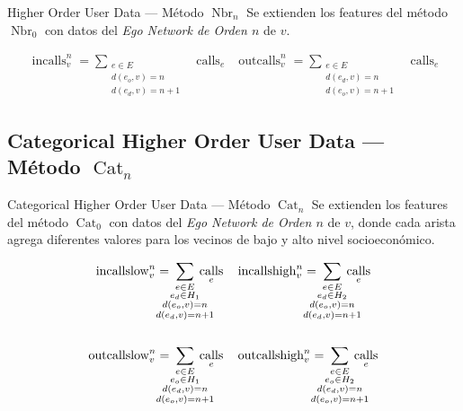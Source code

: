 \documentclass[usenames,dvipsnames,table]{beamer}
\DeclareMathOperator{\calls}{calls}
\DeclareMathOperator{\ego}{Nbr}
\DeclareMathOperator{\cat}{Cat}
\DeclareMathOperator{\incalls}{incalls}
\DeclareMathOperator{\outcalls}{outcalls}
\newcommand{\meight}{\!\!\!\!\!\!\!\!}
\begin{document}
\begin{frame}{Higher Order User Data --- Método $\ego_n$}
	Se extienden los features del método $\ego_0$ con datos del \emph{Ego Network de Orden $n$} de $v$.

	\begin{align*}
		\incalls^n_v  = \meight\sum_{\substack{e \in E \\ d(e_o, v) = n \\ d(e_d, v) = n + 1}}\meight&\calls_e &
		\outcalls^n_v = \meight\sum_{\substack{e \in E \\ d(e_d, v) = n \\ d(e_o, v) = n + 1}}\meight &\calls_e
	\end{align*}
\end{frame}

\subsection{Categorical Higher Order User Data --- Método $\cat_n$}
\begin{frame}{Categorical Higher Order User Data --- Método $\cat_n$}
	Se extienden los features del método $\cat_0$ con datos del \emph{Ego Network de Orden $n$} de $v$, donde cada arista agrega diferentes valores para los vecinos de bajo y alto nivel socioeconómico.

	\begin{align*}
		\operatorname{incallslow}^n_v = \meight\sum_{\substack{e \in E \\ e_d \in H_1 \\ d \left( e_o, v \right) = n \\ d \left( e_d, v \right) = n + 1}}\meight \calls_e &\quad
		\operatorname{incallshigh}^n_v = \meight\sum_{\substack{e \in E \\ e_d \in H_2 \\ d \left( e_o, v \right) = n \\ d \left( e_d, v \right) = n + 1}}\meight \calls_e \\
		\vspace{1em} \\
		\operatorname{outcallslow}^n_v = \meight\sum_{\substack{e \in E \\ e_o \in H_1 \\ d \left( e_d, v \right) = n \\ d \left( e_o, v \right) = n + 1}}\meight \calls_e &\quad
		\operatorname{outcallshigh}^n_v = \meight\sum_{\substack{e \in E \\ e_o \in H_2 \\ d \left( e_d, v \right) = n \\ d \left( e_o, v \right) = n + 1}}\meight \calls_e \\
		\vspace{1em} \\
	\end{align*}
\end{frame}
\end{document}
